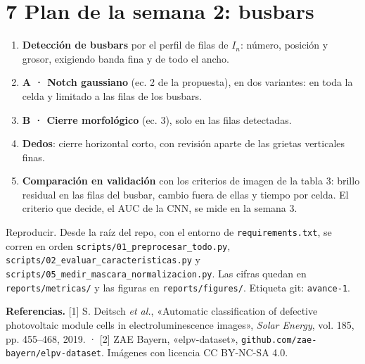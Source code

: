 \documentclass[11pt,a4paper]{article}
\begin{document}
\section*{7 \quad Plan de la semana 2: busbars}

\begin{enumerate}[leftmargin=16pt]
  \item \textbf{Detección de busbars} por el perfil de filas de $I_n$: número, posición y grosor, exigiendo banda fina y de todo el ancho.
  \item \textbf{A · Notch gaussiano} (ec. 2 de la propuesta), en dos variantes: en toda la celda y limitado a las filas de los busbars.
  \item \textbf{B · Cierre morfológico} (ec. 3), solo en las filas detectadas.
  \item \textbf{Dedos}: cierre horizontal corto, con revisión aparte de las grietas verticales finas.
  \item \textbf{Comparación en validación} con los criterios de imagen de la tabla 3: brillo residual en las filas del busbar, cambio fuera de ellas y tiempo
        por celda. El criterio que decide, el AUC de la CNN, se mide en la semana 3.
\end{enumerate}

\vspace{4pt}
\begin{ojo}{Reproducir.}
Desde la raíz del repo, con el entorno de \texttt{requirements.txt}, se corren en orden
\texttt{scripts/01\_preprocesar\_todo.py}, \texttt{scripts/02\_evaluar\_caracteristicas.py} y
\texttt{scripts/05\_medir\_mascara\_normalizacion.py}. Las cifras quedan en \texttt{reports/metricas/} y las figuras en
\texttt{reports/figures/}. Etiqueta git: \texttt{avance-1}.
\end{ojo}

{\small
\textbf{Referencias.}
[1] S. Deitsch \emph{et al.}, «Automatic classification of defective photovoltaic module cells in electroluminescence images», \emph{Solar Energy}, vol. 185,
pp. 455–468, 2019. ·
[2] ZAE Bayern, «elpv-dataset», \texttt{github.com/zae-bayern/elpv-dataset}. Imágenes con licencia CC BY-NC-SA 4.0.
}
\end{document}
